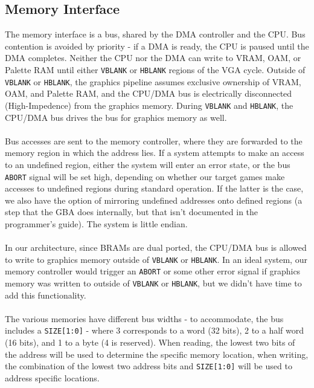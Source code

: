 \documentclass[11pt,a4paper]{article}
\begin{document}
	\subsection{Memory Interface}
	The memory interface is a bus, shared by the DMA controller and the CPU. Bus contention is avoided by priority - if a DMA is ready, the CPU is paused until the DMA completes. Neither the CPU nor the DMA can write to VRAM, OAM, or Palette RAM until either \texttt{VBLANK} or \texttt{HBLANK} regions of the VGA cycle. Outside of \texttt{VBLANK} or \texttt{HBLANK}, the graphics pipeline assumes exclusive ownership of VRAM, OAM, and Palette RAM, and the CPU/DMA bus is electrically disconnected (High-Impedence) from the graphics memory. During \texttt{VBLANK} and \texttt{HBLANK}, the CPU/DMA bus drives the bus for graphics memory as well.\\\\
	Bus accesses are sent to the memory controller, where they are forwarded to the memory region in which the address lies. If a system attempts to make an access to an undefined region, either the system will enter an error state, or the bus \texttt{ABORT} signal will be set high, depending on whether our target games make accesses to undefined regions during standard operation. If the latter is the case, we also have the option of mirroring undefined addresses onto defined regions (a step that the GBA does internally, but that isn't documented in the programmer's guide). The system is little endian.\\\\
	In our architecture, since BRAMs are dual ported, the CPU/DMA bus is allowed to write to graphics memory outside of \texttt{VBLANK} or \texttt{HBLANK}. In an ideal system, our memory controller would trigger an \texttt{ABORT} or some other error signal if graphics memory was written to outside of \texttt{VBLANK} or \texttt{HBLANK}, but we didn't have time to add this functionality. \\\\
	The various memories have different bus widths - to accommodate, the bus includes a \texttt{SIZE[1:0]} - where 3 corresponds to a word (32 bits), 2 to a half word (16 bits), and 1 to a byte (4 is reserved). When reading, the lowest two bits of the address will be used to determine the specific memory location, when writing, the combination of the lowest two address bits and \texttt{SIZE[1:0]} will be used to address specific locations.\\\\
\end{document}
